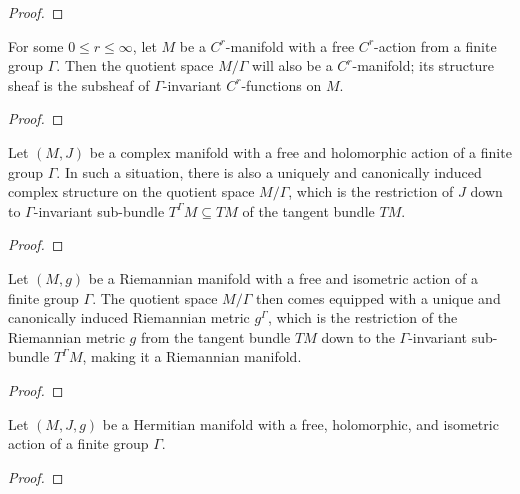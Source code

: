 	            \begin{proof}
                    
	            \end{proof}
            \begin{lemma} \label{lemma: quotients_of_real_manifolds_by_free_actions_of_finite_groups}
                For some $0 \leq r \leq \infty$, let $M$ be a $C^r$-manifold with a free $C^r$-action from a finite group $\Gamma$. Then the quotient space $M/\Gamma$ will also be a $C^r$-manifold; its structure sheaf is the subsheaf of $\Gamma$-invariant $C^r$-functions on $M$.
            \end{lemma}
                \begin{proof}
                    
                \end{proof}
            \begin{proposition} \label{prop: quotients_of_complex_manifolds_by_free_actions_of_finite_groups}
                Let $(M, J)$ be a complex manifold with a free and holomorphic action of a finite group $\Gamma$. In such a situation, there is also a uniquely and canonically induced complex structure on the quotient space $M/\Gamma$, which is the restriction of $J$ down to $\Gamma$-invariant sub-bundle $T^{\Gamma}M \subseteq TM$ of the tangent bundle $TM$.
            \end{proposition}
                \begin{proof}
                            
                \end{proof}
            \begin{proposition} \label{prop: quotients_of_riemannian_manifolds_by_free_actions_of_finite_groups}
                Let $(M, g)$ be a Riemannian manifold with a free and isometric action of a finite group $\Gamma$. The quotient space $M/\Gamma$ then comes equipped with a unique and canonically induced Riemannian metric $g^{\Gamma}$, which is the restriction of the Riemannian metric $g$ from the tangent bundle $TM$ down to the $\Gamma$-invariant sub-bundle $T^{\Gamma}M$, making it a Riemannian manifold.
            \end{proposition}
                \begin{proof}
                            
                \end{proof}
            \begin{corollary} \label{coro: quotients_of_hermitian_manifolds_by_free_actions_of_finite_groups}
                Let $(M, J, g)$ be a Hermitian manifold with a free, holomorphic, and isometric action of a finite group $\Gamma$. 
            \end{corollary}
                \begin{proof}
                    
                \end{proof}
                
